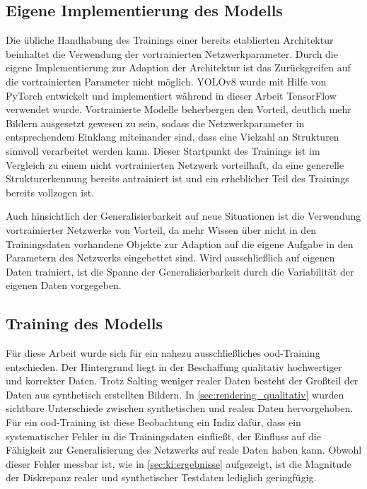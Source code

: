 \subsection{Eigene Implementierung des Modells}

Die übliche Handhabung des Trainings einer bereits etablierten Architektur beinhaltet die Verwendung der vortrainierten Netzwerkparameter. Durch die eigene Implementierung zur Adaption der Architektur ist das Zurückgreifen auf die vortrainierten Parameter nicht möglich. YOLOv8 wurde mit Hilfe von PyTorch entwickelt und implementiert während in dieser Arbeit TensorFlow verwendet wurde. Vortrainierte Modelle beherbergen den Vorteil, deutlich mehr Bildern ausgesetzt gewesen zu sein, sodass die Netzwerkparameter in entsprechendem Einklang miteinander sind, dass eine Vielzahl an Strukturen sinnvoll verarbeitet werden kann. Dieser Startpunkt des Trainings ist im Vergleich zu einem nicht vortrainierten Netzwerk vorteilhaft, da eine generelle Strukturerkennung bereits antrainiert ist und ein erheblicher Teil des Trainings bereits vollzogen ist.

Auch hinsichtlich der Generalisierbarkeit auf neue Situationen ist die Verwendung vortrainierter Netzwerke von Vorteil, da mehr Wissen über nicht in den Trainingsdaten vorhandene Objekte zur Adaption auf die eigene Aufgabe in den Parametern des Netzwerks eingebettet sind. Wird ausschließlich auf eigenen Daten trainiert, ist die Spanne der Generalisierbarkeit durch die Variabilität der eigenen Daten vorgegeben.


\vspace*{-0.1cm}
\subsection{Training des Modells}

Für diese Arbeit wurde sich für ein nahezu ausschließliches \ac{ood}-Training entschieden. Der Hintergrund liegt in der Beschaffung qualitativ hochwertiger und korrekter Daten. Trotz Salting weniger realer Daten besteht der Großteil der Daten aus synthetisch erstellten Bildern. In \autoref{sec:rendering_qualitativ} wurden sichtbare Unterschiede zwischen synthetischen und realen Daten hervorgehoben. Für ein \ac{ood}-Training ist diese Beobachtung ein Indiz dafür, dass ein systematischer Fehler in die Trainingsdaten einfließt, der Einfluss auf die Fähigkeit zur Generalisierung des Netzwerks auf reale Daten haben kann. Obwohl dieser Fehler messbar ist, wie in \autoref{sec:ki:ergebnisse} aufgezeigt, ist die Magnitude der Diskrepanz realer und synthetischer Testdaten lediglich geringfügig.

